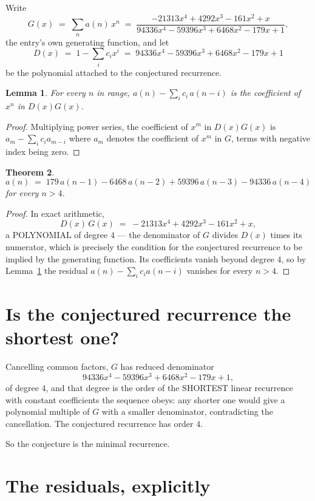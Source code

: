 \documentclass[11pt,a4paper]{article}
\theoremstyle{plain}
\newtheorem{theorem}{Theorem}
\newtheorem{lemma}[theorem]{Lemma}
\theoremstyle{definition}
\begin{document}
Write
\[
G(x)\;=\;\sum_{n}a(n)\,x^{n}\;=\;\frac{- 21313 x^{4} + 4292 x^{3} - 161 x^{2} + x}{94336 x^{4} - 59396 x^{3} + 6468 x^{2} - 179 x + 1},
\]
the entry's own generating function, and let
\[
D(x)\;=\;1-\sum_i c_i x^{i}\;=\;94336 x^{4} - 59396 x^{3} + 6468 x^{2} - 179 x + 1
\]
be the polynomial attached to the conjectured recurrence.

\begin{lemma}\label{lem:key}
For every $n$ in range, $a(n)-\sum_i c_i\,a(n-i)$ is the coefficient of $x^{n}$ in
$D(x)G(x)$.
\end{lemma}

\begin{proof}
Multiplying power series, the coefficient of $x^{m}$ in $D(x)G(x)$ is
$a_m-\sum_i c_i a_{m-i}$ where $a_m$ denotes the coefficient of $x^{m}$ in $G$, terms with
negative index being zero.
\end{proof}

\begin{theorem}
\[
a(n)\;=\;179\,a(n-1) - 6468\,a(n-2) + 59396\,a(n-3) - 94336\,a(n-4)
\]
for every $n>4$.
\end{theorem}

\begin{proof}
In exact arithmetic,
\[
D(x)\,G(x)\;=\;- 21313 x^{4} + 4292 x^{3} - 161 x^{2} + x,
\]
a POLYNOMIAL of degree $4$ --- the denominator of $G$ divides $D(x)$ times its numerator,
which is precisely the condition for the conjectured recurrence to be implied by the
generating function. Its coefficients vanish beyond degree $4$, so by
Lemma~\ref{lem:key} the residual $a(n)-\sum_ic_ia(n-i)$ vanishes for every
$n>4$.
\end{proof}

\section{Is the conjectured recurrence the shortest one?}

Cancelling common factors, $G$ has reduced denominator
\[
94336 x^{4} - 59396 x^{3} + 6468 x^{2} - 179 x + 1,
\]
of degree $4$, and that degree is the order of the SHORTEST linear recurrence with
constant coefficients the sequence obeys: any shorter one would give a polynomial multiple of
$G$ with a smaller denominator, contradicting the cancellation. The conjectured recurrence has
order $4$.

So the conjecture is the minimal recurrence.

\section{The residuals, explicitly}
\end{document}
